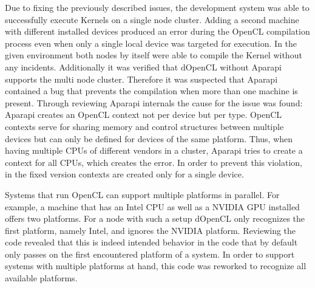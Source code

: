 \begin{description}[style=nextline]
	\item [Failed compilations when using multiple devices]
	Due to fixing the previously described issues, the development system was able to successfully execute Kernels on a single node cluster. Adding a second machine with different installed devices produced an error during the OpenCL compilation process even when only a single local device was targeted for execution. In the given environment both nodes by itself were able to compile the Kernel without any incidents. Additionally it was verified that dOpenCL without Aparapi supports the multi node cluster. Therefore it was suspected that Aparapi contained a bug that prevents the compilation when more than one machine is present. Through reviewing Aparapi internals the cause for the issue was found: Aparapi creates an OpenCL context not per device but per type. OpenCL contexts serve for sharing memory and control structures between multiple devices but can only be defined for devices of the same platform. Thus, when having multiple CPUs of different vendors in a cluster, Aparapi tries to create a context for all CPUs, which creates the error. In order to prevent this violation, in the fixed version contexts are created only for a single device.

	\item [Multiple platforms per machine]
	Systems that run OpenCL can support multiple platforms in parallel. For example, a machine that has an Intel CPU as well as a NVIDIA GPU installed offers two platforms. For a node with such a setup dOpenCL only recognizes the first platform, namely Intel, and ignores the NVIDIA platform. Reviewing the code revealed that this is indeed intended behavior in the code that by default only passes on the first encountered platform of a system. In order to support systems with multiple platforms at hand, this code was reworked to recognize all available platforms.

\end{description}


